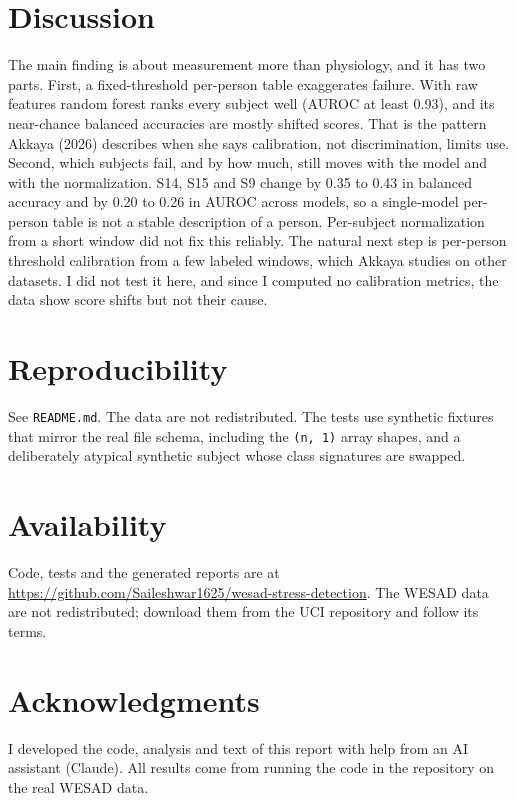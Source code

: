 \documentclass[11pt]{article}
\begin{document}
\hypertarget{discussion}{%
\section{Discussion}\label{discussion}}

The main finding is about measurement more than physiology, and it has
two parts. First, a fixed-threshold per-person table exaggerates
failure. With raw features random forest ranks every subject well (AUROC
at least 0.93), and its near-chance balanced accuracies are mostly
shifted scores. That is the pattern Akkaya (2026) describes when she
says calibration, not discrimination, limits use. Second, which subjects
fail, and by how much, still moves with the model and with the
normalization. S14, S15 and S9 change by 0.35 to 0.43 in balanced
accuracy and by 0.20 to 0.26 in AUROC across models, so a single-model
per-person table is not a stable description of a person. Per-subject
normalization from a short window did not fix this reliably. The natural
next step is per-person threshold calibration from a few labeled
windows, which Akkaya studies on other datasets. I did not test it here,
and since I computed no calibration metrics, the data show score shifts
but not their cause.

\hypertarget{reproducibility}{%
\section{Reproducibility}\label{reproducibility}}

See \texttt{README.md}. The data are not redistributed. The tests use
synthetic fixtures that mirror the real file schema, including the
\texttt{(n,\ 1)} array shapes, and a deliberately atypical synthetic
subject whose class signatures are swapped.


\section*{Availability}
Code, tests and the generated reports are at \url{https://github.com/Saileshwar1625/wesad-stress-detection}. The WESAD data are not redistributed; download them from the UCI repository and follow its terms.

\section*{Acknowledgments}
I developed the code, analysis and text of this report with help from an AI assistant (Claude). All results come from running the code in the repository on the real WESAD data.
\end{document}
